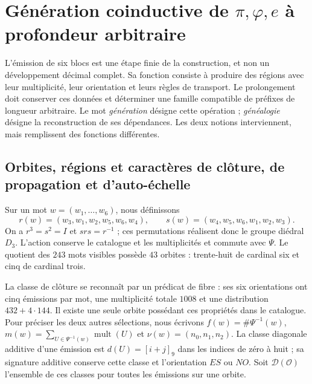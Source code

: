 \section{Génération coinductive de \texorpdfstring{\(\pi,\varphi,e\)}{pi, phi, e} à profondeur arbitraire}
\label{x_reciprocidad:sec:generacion}

L'émission de six blocs est une étape finie de la construction, et non un développement décimal complet. Sa fonction consiste à produire des régions avec leur multiplicité, leur orientation et leurs règles de transport. Le prolongement doit conserver ces données et déterminer une famille compatible de préfixes de longueur arbitraire. Le mot \emph{génération} désigne cette opération ; \emph{généalogie} désigne la reconstruction de ses dépendances. Les deux notions interviennent, mais remplissent des fonctions différentes.

\subsection{Orbites, régions et caractères de clôture, de propagation et d'auto-échelle}

Sur un mot \(w=(w_1,\ldots,w_6)\), nous définissons
\[
 r(w)=(w_3,w_1,w_2,w_5,w_6,w_4),\qquad
 s(w)=(w_4,w_5,w_6,w_1,w_2,w_3).
\]
On a \(r^3=s^2=I\) et \(srs=r^{-1}\) ; ces permutations réalisent donc le groupe diédral \(D_3\). L'action conserve le catalogue et les multiplicités et commute avec \(\Psi\). Le quotient des \(243\) mots visibles possède \(43\) orbites : trente-huit de cardinal six et cinq de cardinal trois.

La classe de clôture se reconnaît par un prédicat de fibre : ses six orientations ont cinq émissions par mot, une multiplicité totale \(1008\) et une distribution \(432+4\cdot144\). Il existe une seule orbite possédant ces propriétés dans le catalogue. Pour préciser les deux autres sélections, nous écrivons \(f(w)=\#\Psi^{-1}(w)\), \(m(w)=\sum_{U\in\Psi^{-1}(w)}\operatorname{mult}(U)\) et \(\nu(w)=(n_0,n_1,n_2)\). La classe diagonale additive d'une émission est \(d(U)=[i+j]_9\) dans les indices de zéro à huit ; sa signature additive conserve cette classe et l'orientation \(ES\) ou \(NO\). Soit \(\mathcal D(\mathcal O)\) l'ensemble de ces classes pour toutes les émissions sur une orbite.


